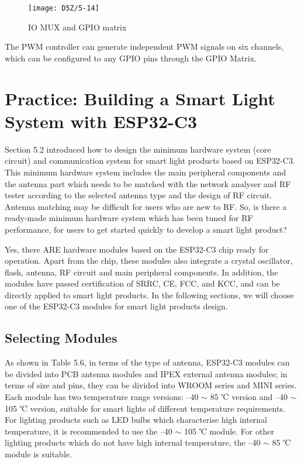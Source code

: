 \documentclass[a4paper,12pt]{book}
\begin{document}
\begin{figure}[h!]
    \centering
    \texttt{[image: D5Z/5-14]}
    \caption{IO MUX and GPIO matrix}
\end{figure}

The PWM controller can generate independent PWM signals on six channels, which can be configured to any GPIO pins through the GPIO Matrix.

\section{Practice: Building a Smart Light System with ESP32-C3}
Section 5.2 introduced how to design the minimum hardware system (core circuit) and communication system for smart light products based on ESP32-C3. This minimum hardware system includes the main peripheral components and the antenna part which needs to be matched with the network analyser and RF tester according to the selected antenna type and the design of RF circuit. Antenna matching may be difficult for users who are new to RF. So, is there a ready-made minimum hardware system which has been tuned for RF performance, for users to get started quickly to develop a smart light product?

Yes, there ARE hardware modules based on the ESP32-C3 chip ready for operation. Apart from the chip, these modules also integrate a crystal oscillator, flash, antenna, RF circuit and main peripheral components. In addition, the modules have passed certification of SRRC, CE, FCC, and KCC, and can be directly applied to smart light products. In the following sections, we will choose one of the ESP32-C3 modules for smart light products design.

\subsection{Selecting Modules}
As shown in Table 5.6, in terms of the type of antenna, ESP32-C3 modules can be divided into PCB antenna modules and IPEX external antenna modules; in terms of size and pins, they can be divided into WROOM series and MINI series. Each module has two temperature range versions: --40 $\sim$ 85 ℃ version and --40 $\sim$ 105 ℃ version, suitable for smart lights of different temperature requirements. For lighting products such as LED bulbs which characterise high internal temperature, it is recommended to use the --40 $\sim$ 105 ℃ module. For other lighting products which do not have high internal temperature, the --40 $\sim$ 85 ℃ module is suitable.
\end{document}
